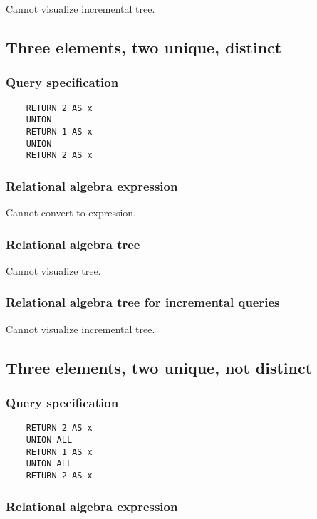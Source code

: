 	Cannot visualize incremental tree.
	\subsection{Three elements, two unique, distinct}

	\subsubsection*{Query specification}

	\begin{lstlisting}
	RETURN 2 AS x
	UNION
	RETURN 1 AS x
	UNION
	RETURN 2 AS x
	\end{lstlisting}


	\subsubsection*{Relational algebra expression}

	Cannot convert to expression.

	\subsubsection*{Relational algebra tree}

	Cannot visualize tree.

	\subsubsection*{Relational algebra tree for incremental queries}

	Cannot visualize incremental tree.
	\subsection{Three elements, two unique, not distinct}

	\subsubsection*{Query specification}

	\begin{lstlisting}
	RETURN 2 AS x
	UNION ALL
	RETURN 1 AS x
	UNION ALL
	RETURN 2 AS x
	\end{lstlisting}


	\subsubsection*{Relational algebra expression}

